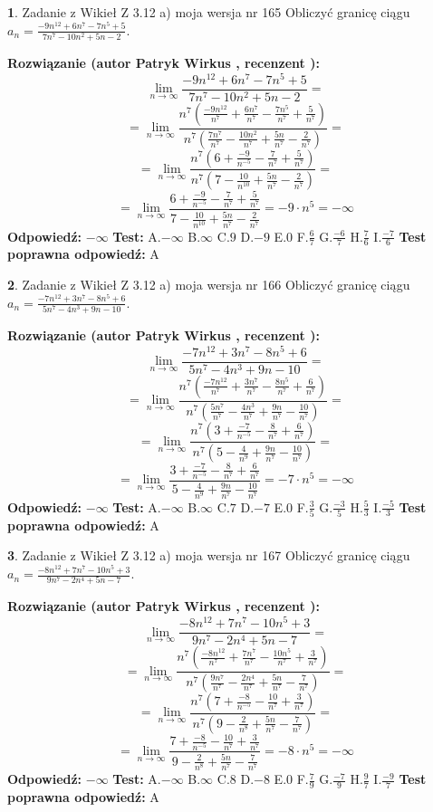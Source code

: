 \documentclass[12pt, a4paper]{article}
\theoremstyle{definition} %
\newtheorem{zad}{}
\newcommand{\zadStart}[1]{\begin{zad}#1\newline}
\newcommand{\zadStop}{\end{zad}}
\newcommand{\rozwStart}[2]{\noindent \textbf{Rozwiązanie (autor #1 , recenzent #2): }\newline}
\newcommand{\rozwStop}{\newline}
\newcommand{\odpStart}{\noindent \textbf{Odpowiedź:}\newline}
\newcommand{\odpStop}{\newline}
\newcommand{\testStart}{\noindent \textbf{Test:}\newline}
\newcommand{\testStop}{\newline}
\newcommand{\kluczStart}{\noindent \textbf{Test poprawna odpowiedź:}\newline}
\newcommand{\kluczStop}{\newline}
\begin{document}
\zadStart{Zadanie z Wikieł Z 3.12 a) moja wersja nr 165}
Obliczyć granicę ciągu $a_{n}=\frac{-9n^{12}+6n^{7}-7n^{5}+5}{7n^{7}-10n^{2}+5n-2}$.
\zadStop
\rozwStart{Patryk Wirkus}{}
$$\lim\limits_{n\to\infty}\frac{-9n^{12}+6n^{7}-7n^{5}+5}{7n^{7}-10n^{2}+5n-2}=$$
$$=\lim\limits_{n\to\infty}\frac{n^{7}\left(\frac{-9n^{12}}{n^{7}}+\frac{6n^{7}}{n^{7}}-\frac{7n^{5}}{n^{7}}+\frac{5}{n^{7}}\right)}{n^{7}\left(\frac{7n^{7}}{n^{7}}-\frac{10n^{2}}{n^{7}}+\frac{5n}{n^{7}}-\frac{2}{n^{7}}\right)}=$$
$$=\lim\limits_{n\to\infty}\frac{n^{7}\left(6+\frac{-9}{n^{-5}}-\frac{7}{n^{7}}+\frac{5}{n^{7}}\right)}
{n^{7}\left(7-\frac{10}{n^{10}}+\frac{5n}{n^{7}}-\frac{2}{n^{7}}\right)}=$$
$$=\lim\limits_{n\to\infty}\frac{6+\frac{-9}{n^{-5}}-\frac{7}{n^{7}}+\frac{5}{n^{7}}}{7-\frac{10}{n^{10}}+\frac{5n}{n^{7}}-\frac{2}{n^{7}}}=-9\cdot n^{5} = -\infty$$
\rozwStop
\odpStart
$-\infty$
\odpStop
\testStart
A.$-\infty$
B.$\infty$
C.$9$
D.$-9$
E.$0$
F.$\frac{6}{7}$
G.$\frac{-6}{7}$
H.$\frac{7}{6}$
I.$\frac{-7}{6}$
\testStop
\kluczStart
A
\kluczStop



\zadStart{Zadanie z Wikieł Z 3.12 a) moja wersja nr 166}
Obliczyć granicę ciągu $a_{n}=\frac{-7n^{12}+3n^{7}-8n^{5}+6}{5n^{7}-4n^{3}+9n-10}$.
\zadStop
\rozwStart{Patryk Wirkus}{}
$$\lim\limits_{n\to\infty}\frac{-7n^{12}+3n^{7}-8n^{5}+6}{5n^{7}-4n^{3}+9n-10}=$$
$$=\lim\limits_{n\to\infty}\frac{n^{7}\left(\frac{-7n^{12}}{n^{7}}+\frac{3n^{7}}{n^{7}}-\frac{8n^{5}}{n^{7}}+\frac{6}{n^{7}}\right)}{n^{7}\left(\frac{5n^{7}}{n^{7}}-\frac{4n^{3}}{n^{7}}+\frac{9n}{n^{7}}-\frac{10}{n^{7}}\right)}=$$
$$=\lim\limits_{n\to\infty}\frac{n^{7}\left(3+\frac{-7}{n^{-5}}-\frac{8}{n^{7}}+\frac{6}{n^{7}}\right)}
{n^{7}\left(5-\frac{4}{n^{9}}+\frac{9n}{n^{7}}-\frac{10}{n^{7}}\right)}=$$
$$=\lim\limits_{n\to\infty}\frac{3+\frac{-7}{n^{-5}}-\frac{8}{n^{7}}+\frac{6}{n^{7}}}{5-\frac{4}{n^{9}}+\frac{9n}{n^{7}}-\frac{10}{n^{7}}}=-7\cdot n^{5} = -\infty$$
\rozwStop
\odpStart
$-\infty$
\odpStop
\testStart
A.$-\infty$
B.$\infty$
C.$7$
D.$-7$
E.$0$
F.$\frac{3}{5}$
G.$\frac{-3}{5}$
H.$\frac{5}{3}$
I.$\frac{-5}{3}$
\testStop
\kluczStart
A
\kluczStop



\zadStart{Zadanie z Wikieł Z 3.12 a) moja wersja nr 167}
Obliczyć granicę ciągu $a_{n}=\frac{-8n^{12}+7n^{7}-10n^{5}+3}{9n^{7}-2n^{4}+5n-7}$.
\zadStop
\rozwStart{Patryk Wirkus}{}
$$\lim\limits_{n\to\infty}\frac{-8n^{12}+7n^{7}-10n^{5}+3}{9n^{7}-2n^{4}+5n-7}=$$
$$=\lim\limits_{n\to\infty}\frac{n^{7}\left(\frac{-8n^{12}}{n^{7}}+\frac{7n^{7}}{n^{7}}-\frac{10n^{5}}{n^{7}}+\frac{3}{n^{7}}\right)}{n^{7}\left(\frac{9n^{7}}{n^{7}}-\frac{2n^{4}}{n^{7}}+\frac{5n}{n^{7}}-\frac{7}{n^{7}}\right)}=$$
$$=\lim\limits_{n\to\infty}\frac{n^{7}\left(7+\frac{-8}{n^{-5}}-\frac{10}{n^{7}}+\frac{3}{n^{7}}\right)}
{n^{7}\left(9-\frac{2}{n^{8}}+\frac{5n}{n^{7}}-\frac{7}{n^{7}}\right)}=$$
$$=\lim\limits_{n\to\infty}\frac{7+\frac{-8}{n^{-5}}-\frac{10}{n^{7}}+\frac{3}{n^{7}}}{9-\frac{2}{n^{8}}+\frac{5n}{n^{7}}-\frac{7}{n^{7}}}=-8\cdot n^{5} = -\infty$$
\rozwStop
\odpStart
$-\infty$
\odpStop
\testStart
A.$-\infty$
B.$\infty$
C.$8$
D.$-8$
E.$0$
F.$\frac{7}{9}$
G.$\frac{-7}{9}$
H.$\frac{9}{7}$
I.$\frac{-9}{7}$
\testStop
\kluczStart
A
\kluczStop
\end{document}
